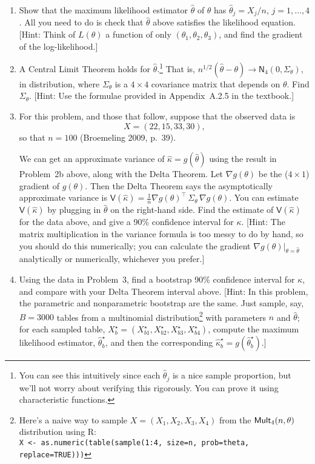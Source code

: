\documentclass[a4paper,12pt]{article}
\newcommand{\var}{\mathsf{V}}
\newcommand{\nm}{\mathsf{N}}
\newcommand{\grad}{\nabla}
\begin{document}
\begin{enumerate}

\item Show that the maximum likelihood estimator $\hat\theta$ of $\theta$ has $\hat\theta_j=X_j/n$, $j=1,\ldots,4$.  All you need to do is check that $\hat\theta$ above satisfies the likelihood equation.  [Hint: Think of $L(\theta)$ a function of only $(\theta_1,\theta_2,\theta_3)$, and find the gradient of the log-likelihood.]

\item A Central Limit Theorem holds for $\hat\theta$.\footnote{You can see this intuitively since each $\hat\theta_j$ is a nice sample proportion, but we'll not worry about verifying this rigorously.  You can prove it using characteristic functions.}  That is, $n^{1/2}(\hat\theta - \theta) \to \nm_4(0, \Sigma_\theta)$, in distribution, where $\Sigma_\theta$ is a $4 \times 4$ covariance matrix that depends on $\theta$.  Find $\Sigma_\theta$.  [Hint: Use the formulae provided in Appendix~A.2.5 in the textbook.]

\item For this problem, and those that follow, suppose that the observed data is 
\[ X = (22, 15, 33, 30), \]
so that $n=100$ (Broemeling 2009, p.~39).  

We can get an approximate variance of $\hat\kappa=g(\hat\theta)$ using the result in Problem~2b above, along with the Delta Theorem.  Let $\grad g(\theta)$ be the ($4 \times 1$) gradient of $g(\theta)$.  Then the Delta Theorem says the asymptotically approximate variance is $\var(\hat\kappa) = \frac1n \grad g(\theta)^\top \,\Sigma_{\theta} \,\grad g(\theta)$.  You can estimate $\var(\hat\kappa)$ by plugging in $\hat\theta$ on the right-hand side.  Find the estimate of $\var(\hat\kappa)$ for the data above, and give a 90\% confidence interval for $\kappa$.  [Hint: The matrix multiplication in the variance formula is too messy to do by hand, so you should do this numerically; you can calculate the gradient $\grad g(\theta)|_{\theta=\hat\theta}$ analytically or numerically, whichever you prefer.]

\item Using the data in Problem~3, find a bootstrap 90\% confidence interval for $\kappa$, and compare with your Delta Theorem interval above.  [Hint: In this problem, the parametric and nonparametric bootstrap are the same.  Just sample, say, $B=3000$ tables from a multinomial distribution\footnote{Here's a naive way to sample $X=(X_1,X_2,X_3,X_4)$ from the ${\sf Mult}_4(n,\theta)$ distribution using R: \\ {\tt X <- as.numeric(table(sample(1:4, size=n, prob=theta, replace=TRUE)))}} with parameters $n$ and $\hat\theta$; for each sampled table, $X_b^\star=(X_{b1}^\star,X_{b2}^\star, X_{b3}^\star, X_{b4}^\star)$, compute the maximum likelihood estimator, $\hat\theta_b^\star$, and then the corresponding $\hat\kappa_b^\star=g(\hat\theta_b^\star)$.]  


\end{enumerate}
\end{document}
